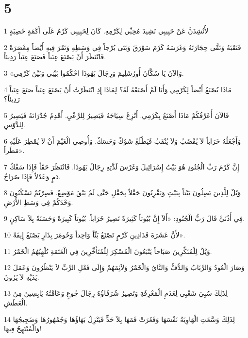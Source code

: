 \chapter{5}

\par 1 لأُنْشِدَنَّ عَنْ حَبِيبِي نَشِيدَ مُحِبِّي لِكَرْمِهِ. كَانَ لِحَبِيبِي كَرْمٌ عَلَى أَكَمَةٍ خَصِبَةٍ
\par 2 فَنَقَبَهُ وَنَقَّى حِجَارَتَهُ وَغَرَسَهُ كَرْمَ سَوْرَقَ وَبَنَى بُرْجاً فِي وَسَطِهِ وَنَقَرَ فِيهِ أَيْضاً مِعْصَرَةً فَانْتَظَرَ أَنْ يَصْنَعَ عِنَباً فَصَنَعَ عِنَباً رَدِيئاً.
\par 3 «وَالآنَ يَا سُكَّانَ أُورُشَلِيمَ وَرِجَالَ يَهُوذَا احْكُمُوا بَيْنِي وَبَيْنَ كَرْمِي.
\par 4 مَاذَا يُصْنَعُ أَيْضاً لِكَرْمِي وَأَنَا لَمْ أَصْنَعْهُ لَهُ؟ لِمَاذَا إِذِ انْتَظَرْتُ أَنْ يَصْنَعَ عِنَباً صَنَعَ عِنَباً رَدِيئاً؟
\par 5 فَالآنَ أُعَرِّفُكُمْ مَاذَا أَصْنَعُ بِكَرْمِي. أَنْزِعُ سِيَاجَهُ فَيَصِيرُ لِلرَّعْيِ. أَهْدِمُ جُدْرَانَهُ فَيَصِيرُ لِلدَّوْسِ.
\par 6 وَأَجْعَلُهُ خَرَاباً لاَ يُقْضَبُ وَلاَ يُنْقَبُ فَيَطْلَعُ شَوْكٌ وَحَسَكٌ. وَأُوصِي الْغَيْمَ أَنْ لاَ يُمْطِرَ عَلَيْهِ مَطَراً».
\par 7 إِنَّ كَرْمَ رَبِّ الْجُنُودِ هُوَ بَيْتُ إِسْرَائِيلَ وَغَرْسَ لَذَّتِهِ رِجَالُ يَهُوذَا. فَانْتَظَرَ حَقّاً فَإِذَا سَفْكُ دَمٍ وَعَدْلاً فَإِذَا صُرَاخٌ.
\par 8 وَيْلٌ لِلَّذِينَ يَصِلُونَ بَيْتاً بِبَيْتٍ وَيَقْرِنُونَ حَقْلاً بِحَقْلٍ حَتَّى لَمْ يَبْقَ مَوْضِعٌ. فَصِرْتُمْ تَسْكُنُونَ وَحْدَكُمْ فِي وَسَطِ الأَرْضِ.
\par 9 فِي أُذُنَيَّ قَالَ رَبُّ الْجُنُودِ: «أَلاَ إِنَّ بُيُوتاً كَثِيرَةً تَصِيرُ خَرَاباً. بُيُوتاً كَبِيرَةً وَحَسَنَةً بِلاَ سَاكِنٍ.
\par 10 لأَنَّ عَشَرَةَ فَدَادِينِ كَرْمٍ تَصْنَعُ بَثّاً وَاحِداً وَحُومَرَ بِذَارٍ يَصْنَعُ إِيفَةً».
\par 11 وَيْلٌ لِلْمُبَكِّرِينَ صَبَاحاً يَتْبَعُونَ الْمُسْكِرَ لِلْمُتَأَخِّرِينَ فِي الْعَتَمَةِ تُلْهِبُهُمُ الْخَمْرُ.
\par 12 وَصَارَ الْعُودُ وَالرَّبَابُ وَالدُّفُّ وَالنَّايُ وَالْخَمْرُ وَلاَئِمَهُمْ وَإِلَى فَعْلِ الرَّبِّ لاَ يَنْظُرُونَ وَعَمَلَ يَدَيْهِ لاَ يَرُونَ.
\par 13 لِذَلِكَ سُبِيَ شَعْبِي لِعَدَمِ الْمَعْرِفَةِ وَتَصِيرُ شُرَفَاؤُهُ رِجَالَ جُوعٍ وَعَامَّتُهُ يَابِسِينَ مِنَ الْعَطَشِ.
\par 14 لِذَلِكَ وَسَّعَتِ الْهَاوِيَةُ نَفْسَهَا وَفَغَرَتْ فَمَهَا بِلاَ حَدٍّ فَيَنْزِلُ بَهَاؤُهَا وَجُمْهُورُهَا وَضَجِيجُهَا وَالْمُبْتَهِجُ فِيهَا!
